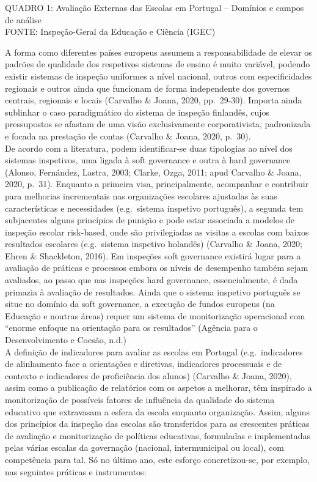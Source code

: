 \documentclass[
]{book}
\theoremstyle{definition}
\theoremstyle{definition}
\theoremstyle{definition}
\theoremstyle{definition}
\theoremstyle{remark}
\begin{document}
QUADRO 1: Avaliação Externas das Escolas em Portugal -- Domínios e campos de análise\\
FONTE: Inspeção-Geral da Educação e Ciência (IGEC)

A forma como diferentes países europeus assumem a responsabilidade de elevar os padrões de qualidade dos respetivos sistemas de ensino é muito variável, podendo existir sistemas de inspeção uniformes a nível nacional, outros com especificidades regionais e outros ainda que funcionam de forma independente dos governos centrais, regionais e locais (Carvalho \& Joana, 2020, pp.~29-30). Importa ainda sublinhar o caso paradigmático do sistema de inspeção finlandês, cujos pressupostos se afastam de uma visão exclusivamente corporativista, padronizada e focada na prestação de contas (Carvalho \& Joana, 2020, p.~30).\\
De acordo com a literatura, podem identificar-se duas tipologias ao nível dos sistemas inspetivos, uma ligada à soft governance e outra à hard governance (Alonso, Fernández, Lastra, 2003; Clarke, Ozga, 2011; apud Carvalho \& Joana, 2020, p.~31). Enquanto a primeira visa, principalmente, acompanhar e contribuir para melhorias incrementais nas organizações escolares ajustadas às suas características e necessidades (e.g.~sistema inspetivo português), a segunda tem subjacentes alguns princípios de punição e pode estar associada a modelos de inspeção escolar risk-based, onde são privilegiadas as visitas a escolas com baixos resultados escolares (e.g.~sistema inspetivo holandês) (Carvalho \& Joana, 2020; Ehren \& Shackleton, 2016). Em inspeções soft governance existirá lugar para a avaliação de práticas e processos embora os níveis de desempenho também sejam avaliados, ao passo que nas inspeções hard governance, essencialmente, é dada primazia à avaliação de resultados. Ainda que o sistema inspetivo português se situe no domínio da soft governance, a execução de fundos europeus (na Educação e noutras áreas) requer um sistema de monitorização operacional com ``enorme enfoque na orientação para os resultados'' (Agência para o Desenvolvimento e Coesão, n.d.)\\
A definição de indicadores para avaliar as escolas em Portugal (e.g.~indicadores de alinhamento face a orientações e diretivas, indicadores processuais e de contexto e indicadores de proficiência dos alunos) (Carvalho \& Joana, 2020), assim como a publicação de relatórios com os aspetos a melhorar, têm inspirado a monitorização de possíveis fatores de influência da qualidade do sistema educativo que extravasam a esfera da escola enquanto organização. Assim, alguns dos princípios da inspeção das escolas são transferidos para as crescentes práticas de avaliação e monitorização de políticas educativas, formuladas e implementadas pelas várias escalas da governação (nacional, intermunicipal ou local), com competência para tal. Só no último ano, este esforço concretizou-se, por exemplo, nas seguintes práticas e instrumentos:
\end{document}
